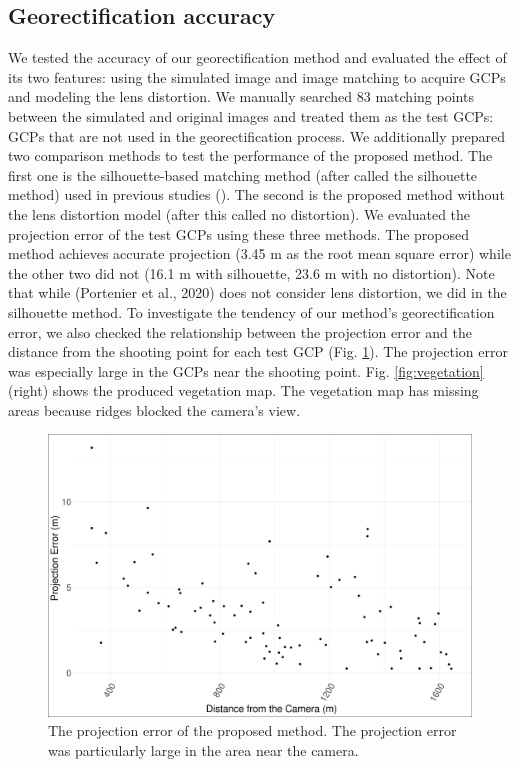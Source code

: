 \documentclass{article}
\begin{document}
\hypertarget{georectification-accuracy}{%
\subsection{Georectification accuracy}\label{georectification-accuracy}}

We tested the accuracy of our georectification method and evaluated the effect of its two features: using the simulated image and image matching to acquire GCPs and modeling the lens distortion. We manually searched 83 matching points between the simulated and original images and treated them as the test GCPs: GCPs that are not used in the georectification process. We additionally prepared two comparison methods to test the performance of the proposed method. The first one is the silhouette-based matching method (after called the silhouette method) used in previous studies (\cite{Portenier2020Cryosphere}). The second is the proposed method without the lens distortion model (after this called no distortion). We evaluated the projection error of the test GCPs using these three methods. The proposed method achieves accurate projection (3.45 m as the root mean square error) while the other two did not (16.1 m with silhouette, 23.6 m with no distortion). Note that while (Portenier et al., 2020) does not consider lens distortion, we did in the silhouette method. To investigate the tendency of our method's georectification error, we also checked the relationship between the projection error and the distance from the shooting point for each test GCP (Fig. \ref{fig:geoacc}). The projection error was especially large in the GCPs near the shooting point. Fig. \ref{fig:vegetation} (right) shows the produced vegetation map. The vegetation map has missing areas because ridges blocked the camera's view.



\begin{figure}
\includegraphics[width=1\linewidth]{paper_files/figures/georec_acc} \caption{The projection error of the proposed method. The projection error was particularly large in the area near the camera.}\label{fig:geoacc}
\end{figure}
\end{document}
